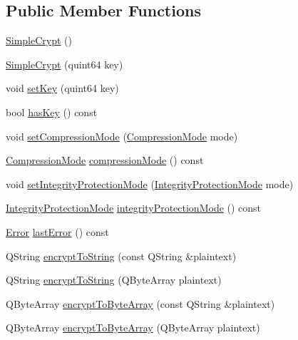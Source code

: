 \subsection*{Public Member Functions}
\begin{DoxyCompactItemize}
\item 
\hyperlink{class_simple_crypt_ac474d12cfa9f93bfecea35891831046d}{Simple\-Crypt} ()
\item 
\hyperlink{class_simple_crypt_a65942757b85b3dd36618ea3edc5ceb89}{Simple\-Crypt} (quint64 key)
\item 
void \hyperlink{class_simple_crypt_aa7aad9ed2e88b883ba9214c7d9928745}{set\-Key} (quint64 key)
\item 
bool \hyperlink{class_simple_crypt_aa7cab41b041f1fbe1c62e484fea895ce}{has\-Key} () const 
\item 
void \hyperlink{class_simple_crypt_adc6c6355aa276c0d3516f7ad273f063b}{set\-Compression\-Mode} (\hyperlink{class_simple_crypt_a25298e746f175cf175a18f082092ca8e}{Compression\-Mode} mode)
\item 
\hyperlink{class_simple_crypt_a25298e746f175cf175a18f082092ca8e}{Compression\-Mode} \hyperlink{class_simple_crypt_a303253756b925678e53bafc8b72a4e96}{compression\-Mode} () const 
\item 
void \hyperlink{class_simple_crypt_a4fef5e6d3246ee57d6a7b68475b12b8b}{set\-Integrity\-Protection\-Mode} (\hyperlink{class_simple_crypt_a42a5172e558d346b28421cc4e85feb2d}{Integrity\-Protection\-Mode} mode)
\item 
\hyperlink{class_simple_crypt_a42a5172e558d346b28421cc4e85feb2d}{Integrity\-Protection\-Mode} \hyperlink{class_simple_crypt_a81929610d0fd5667db83603f396ddb66}{integrity\-Protection\-Mode} () const 
\item 
\hyperlink{class_simple_crypt_ab7f81049e78f021b55a36f7cfac5a09b}{Error} \hyperlink{class_simple_crypt_a123562e29377ab26e3b398b588f596d9}{last\-Error} () const 
\item 
Q\-String \hyperlink{class_simple_crypt_af26a3d3c6cef9732190c1d2c6a53a5b5}{encrypt\-To\-String} (const Q\-String \&plaintext)
\item 
Q\-String \hyperlink{class_simple_crypt_aa72b79bf7a5bb971bf3b0a52b9247efd}{encrypt\-To\-String} (Q\-Byte\-Array plaintext)
\item 
Q\-Byte\-Array \hyperlink{class_simple_crypt_ae1991c7748b2bb74468bee0be372d2c4}{encrypt\-To\-Byte\-Array} (const Q\-String \&plaintext)
\item 
Q\-Byte\-Array \hyperlink{class_simple_crypt_a741305d04e86bcb7d4625b05bf234887}{encrypt\-To\-Byte\-Array} (Q\-Byte\-Array plaintext)

\end{DoxyCompactItemize}
